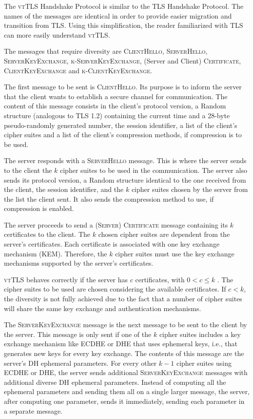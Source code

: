 \documentclass{sig-alternate-05-2015}
\newcommand{\msg}[1]{\textsc{{#1}}}
\begin{document}
The \textsc{vtTLS} Handshake Protocol is similar to the TLS Handshake Protocol. The names of the messages are identical in order to provide easier migration and transition from TLS.
Using this simplification, the reader familiarized with TLS can more easily understand \textsc{vtTLS}.

The messages that require diversity  are \msg{ClientHello}, \msg{ServerHello}, \msg{ServerKeyExchange}, \msg{k-ServerKey\-Ex\-change}, (Server and Client) \msg{Certificate}, \msg{ClientKeyExchange} and \msg{k-ClientKeyExchange}.

The first message to be sent is  \msg{ClientHello}. Its purpose is to inform the server that the client wants to establish a  secure channel for communication. The content of this message consists in the client's protocol version, a Random structure (analogous to TLS 1.2) containing the current time and a 28-byte pseudo-randomly generated number, the session identifier, a list of the client's cipher suites and a list of the client's compression methods, if compression is to be used.

The server responds with a  \msg{ServerHello} message. This is where the server sends to the client the $k$ cipher suites to be used in the communication. The server also sends its protocol version, a Random structure identical to the one received from the client, the session identifier, and the $k$ cipher suites chosen by the server from the list the client sent. It  also sends the compression method to use, if compression is %
enabled.

The server proceeds to send a \msg{(Server) Certificate} message containing its $k$ certificates to the client. The $k$ chosen cipher suites are dependent from the server's certificates. Each certificate is associated with one key exchange mechanism (KEM). Therefore, the $k$ cipher suites must use the key exchange mechanisms supported by the server's certificates.

\textsc{vtTLS} behaves correctly if the server has $c$ certificates, with $0 < c \leq k$ . The cipher suites to be used are chosen considering the available certificates. If $c < k$, the diversity is not fully achieved due to the fact that a number of cipher suites will share the same %
key exchange and authentication mechanisms.

The \msg{ServerKeyExchange} message is the next message to be sent to the client by the server. This message is only sent if one of the $k$ cipher suites includes a key exchange mechanism like ECDHE or DHE that uses ephemeral keys, i.e., that generates new keys for every key exchange. The contents of this message are the server's DH ephemeral parameters. For every other $k - 1$ cipher suites using ECDHE or DHE, the server sends additional \msg{ServerKeyExchange} messages with additional diverse DH ephemeral parameters.
Instead of computing all the ephemeral parameters and sending them all on a single larger message, the server, after computing one parameter, sends it immediately, sending each parameter in a separate message.
\end{document}
